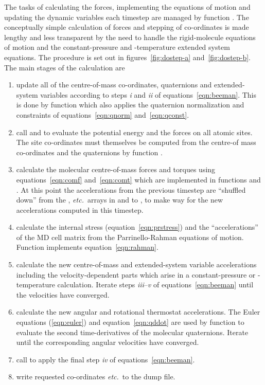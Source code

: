 \documentclass[a4paper,twoside]{report}
\newcommand{\etc}{\emph{etc.}}
\begin{document}
The tasks of calculating the forces, implementing the equations of
motion and updating the dynamic variables each timestep are managed
by function .  The conceptually simple calculation of
forces and stepping of co-ordinates is made lengthy and less
transparent by the need to handle the rigid-molecule equations of
motion and the constant-pressure and -temperature extended system
equations.  The procedure is set out in figures~\ref{fig:dostep-a}
and~\ref{fig:dostep-b}.  The main stages of the calculation are
\begin{enumerate}
\renewcommand{\theenumi}{\emph{\alph{enumi}}}
\item update all of the centre-of-mass co-ordinates, quaternions and
  extended-system variables according to steps \emph{i} and
  \emph{ii} of equations~\ref{eqn:beeman}. This is done by function
   which also applies the quaternion normalization
  and constraints of equations~\ref{eqn:qnorm} and~\ref{eqn:qconst}.
\item call  and  to
  evaluate the potential energy and the forces on all atomic sites.
  The site co-ordinates must themselves be computed from the centre-of
  mass co-ordinates and the quaternions by function
  . 
\item calculate the molecular centre-of-mass forces and torques using
  equations~\ref{eqn:comf} and~\ref{eqn:comt}  which are implemented
  in functions  and . At
  this point the accelerations from the previous timestep are
  ``shuffled down'' from the ,  \etc\ arrays
  in  and  to ,
   to make way for the new accelerations computed in
  this timestep. 
\item calculate the internal stress (equation~\ref{eqn:prstress}) and
  the ``accelerations'' of the MD cell matrix from the
  Parrinello-Rahman equations of motion. Function 
  implements equation~\ref{eqn:rahman}.
\item calculate the new centre-of-mass and extended-system
  variable accelerations including the velocity-dep\-end\-ent parts
  which arise in a constant-pressure or -temperature calculation.
  Iterate steps \emph{iii}--\emph{v} of equations~\ref{eqn:beeman}
  until the velocities have converged. \label{loop:vel}
\item calculate the new angular and rotational thermostat
  accelerations. The Euler equations (\ref{eqn:euler}) and
  equation~\ref{eqn:qddot} are used by function  to
  evaluate the second time-derivatives of the molecular quaternions.
  Iterate until the corresponding angular velocities have
  converged. \label{loop:quat} 
\item call  to apply the final step \emph{iv} of
  equations~\ref{eqn:beeman}.
\item write requested co-ordinates \etc\ to the dump file.
\end{enumerate}
\end{document}
